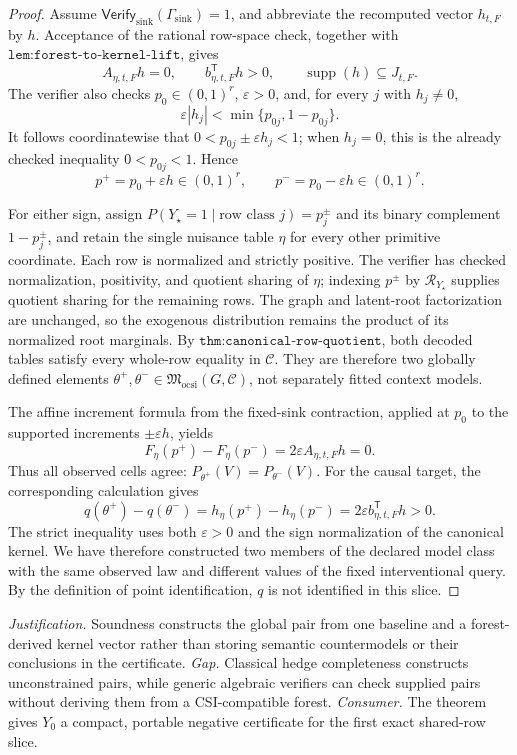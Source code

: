 \documentclass{article}
\begin{document}
\begin{proof}
Assume \(\mathsf{Verify}_{\mathrm{sink}}(\Gamma_{\mathrm{sink}})=1\), and abbreviate the recomputed vector \(h_{t,F}\) by \(h\). Acceptance of the rational row-space check, together with \(\texttt{lem:forest-to-kernel-lift}\), gives
\[
 A_{\eta,t,F}h=0,
 \qquad
 b_{\eta,t,F}^{\mathsf T}h>0,
 \qquad
 \operatorname{supp}(h)\subseteq J_{t,F}.
\]
The verifier also checks \(p_0\in(0,1)^r\), \(\varepsilon>0\), and, for every \(j\) with \(h_j\ne0\),
\[
 \varepsilon |h_j|<\min\{p_{0j},1-p_{0j}\}.
\]
It follows coordinatewise that \(0<p_{0j}\pm\varepsilon h_j<1\); when \(h_j=0\), this is the already checked inequality \(0<p_{0j}<1\). Hence
\[
 p^+=p_0+\varepsilon h\in(0,1)^r,
 \qquad
 p^-=p_0-\varepsilon h\in(0,1)^r.
\]

For either sign, assign \(P(Y_\star=1\mid\text{row class }j)=p_j^\pm\) and its binary complement \(1-p_j^\pm\), and retain the single nuisance table \(\eta\) for every other primitive coordinate. Each row is normalized and strictly positive. The verifier has checked normalization, positivity, and quotient sharing of \(\eta\); indexing \(p^\pm\) by \(\mathcal R_{Y_\star}\) supplies quotient sharing for the remaining rows. The graph and latent-root factorization are unchanged, so the exogenous distribution remains the product of its normalized root marginals. By \(\texttt{thm:canonical-row-quotient}\), both decoded tables satisfy every whole-row equality in \(\mathcal C\). They are therefore two globally defined elements \(\theta^+,\theta^-\in\mathfrak M_{\mathrm{ocsi}}(G,\mathcal C)\), not separately fitted context models.

The affine increment formula from the fixed-sink contraction, applied at \(p_0\) to the supported increments \(\pm\varepsilon h\), yields
\[
 F_\eta(p^+)-F_\eta(p^-)
 =2\varepsilon A_{\eta,t,F}h=0.
\]
Thus all observed cells agree: \(P_{\theta^+}(V)=P_{\theta^-}(V)\). For the causal target, the corresponding calculation gives
\[
 q(\theta^+)-q(\theta^-)
 =h_\eta(p^+)-h_\eta(p^-)
 =2\varepsilon b_{\eta,t,F}^{\mathsf T}h>0.
\]
The strict inequality uses both \(\varepsilon>0\) and the sign normalization of the canonical kernel. We have therefore constructed two members of the declared model class with the same observed law and different values of the fixed interventional query. By the definition of point identification, \(q\) is not identified in this slice.
\end{proof}
\par\smallskip\noindent \textit{Justification.} Soundness constructs the global pair from one baseline and a forest-derived kernel vector rather than storing semantic countermodels or their conclusions in the certificate. \textit{Gap.} Classical hedge completeness constructs unconstrained pairs, while generic algebraic verifiers can check supplied pairs without deriving them from a CSI-compatible forest. \textit{Consumer.} The theorem gives \(Y_0\) a compact, portable negative certificate for the first exact shared-row slice.
\end{document}
